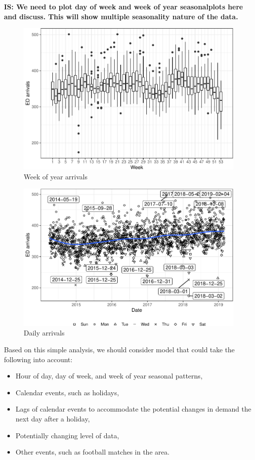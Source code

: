 \documentclass[]{elsarticle} %
\providecommand{\tightlist}{%
  \setlength{\itemsep}{0pt}\setlength{\parskip}{0pt}}
\begin{document}
\textbf{IS: We need to plot day of week and week of year seasonalplots here and discuss. This will show multiple seasonality nature of the data.}

\begin{figure}[H]

{\centering \includegraphics[width=0.7\linewidth]{paper_files/figure-latex/seasonplot-weekofyear-1} 

}

\caption{Week of year arrivals}\label{fig:seasonplot-weekofyear}
\end{figure}

\begin{figure}[H]

{\centering \includegraphics[width=0.7\linewidth]{paper_files/figure-latex/date-plot-1} 

}

\caption{Daily arrivals}\label{fig:date-plot}
\end{figure}

Based on this simple analysis, we should consider model that could take the following into account:

\begin{itemize}
\tightlist
\item
  Hour of day, day of week, and week of year seasonal patterns,
\item
  Calendar events, such as holidays,
\item
  Lags of calendar events to accommodate the potential changes in demand the next day after a holiday,
\item
  Potentially changing level of data,
\item
  Other events, such as football matches in the area.
\end{itemize}
\end{document}
